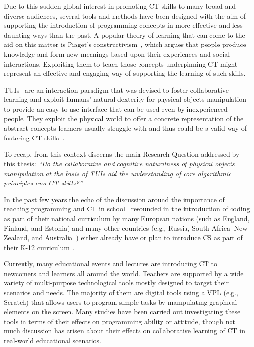 Due to this sudden global interest in promoting \ac{CT} skills to many broad and diverse audiences, several tools and methods have been designed with the aim of supporting the introduction of programming concepts in more effective and less daunting ways than the past. A popular theory of learning that can come to the aid on this matter is Piaget's constructivism~\cite{Piaget:1969vq}, which argues that people produce knowledge and form new meanings based upon their experiences and social interactions. Exploiting them to teach those concepts underpinning \ac{CT} might represent an effective and engaging way of supporting the learning of such skills.

\acp{TUI}~\cite{Ishii:1997gy} are an interaction paradigm that was devised to foster collaborative learning and exploit humans' natural dexterity for physical objects manipulation to provide an easy to use interface that can be used even by inexperienced people. They exploit the physical world to offer a concrete representation of the abstract concepts learners usually struggle with and thus could be a valid way of fostering \ac{CT} skills~\cite{McNerney:2004jc,Horn:2009be}.

To recap, from this context discerns the main Research Question addressed by this thesis: \textit{``Do the collaborative and cognitive naturalness of physical objects manipulation at the basis of \acp{TUI} aid the understanding of core algorithmic principles and  \ac{CT} skills?''}.

In the past few years the echo of the discussion around the importance of teaching programming and \ac{CT} in school~\cite{Anonymous:2011kk} resounded in the introduction of coding as part of their national curriculum by many European nations (such as England, Finland, and Estonia) and many other countries (e.g., Russia, South Africa, New Zealand, and Australia~\cite{Balanskat:aDdZD1gb}) either already have or plan to introduce \ac{CS} as part of their K-12 curriculum~\cite{Grover:2013gj}.

Currently, many educational events and lectures are introducing \ac{CT} to newcomers and learners all around the world. Teachers are supported by a wide variety of multi-purpose technological tools mostly designed to target their scenarios and needs. The majority of them are digital tools using a \ac{VPL} (e.g., Scratch) that allows users to program simple tasks by manipulating graphical elements on the screen. Many studies have been carried out investigating these tools in terms of their effects on programming ability or attitude, though not much discussion has arisen about their effects on collaborative learning of \ac{CT} in real-world educational scenarios.

